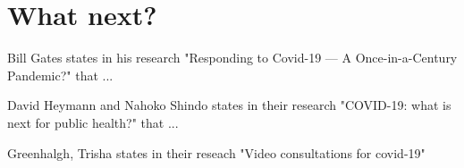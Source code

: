 \section{What next?}

Bill Gates states in his research "Responding to Covid-19 — A Once-in-a-Century Pandemic?" that ...

David Heymann and Nahoko Shindo states in their research "COVID-19: what is next for public health?" \cite{Heymann2020} that ...

Greenhalgh, Trisha states in their reseach "Video consultations for covid-19" \cite{Greenhalgh2020}







